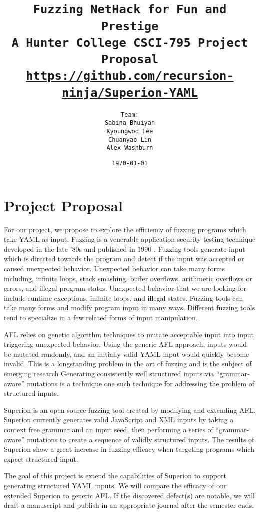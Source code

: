 \documentclass[12pt]{diazessay}
\title{\texttt{\huge{Fuzzing NetHack for Fun and Prestige} \\\vspace{-0.65cm} {\large A Hunter College CSCI-795 Project Proposal}\\\normalsize\url{https://github.com/recursion-ninja/Superion-YAML}}} %
\author{\texttt{{\Huge Team:}\\\vspace*{-0.5em} 
		Sabina Bhuiyan \\\vspace*{-0.5em} 
		Kyoungwoo Lee \\\vspace*{-0.5em}
		Chuanyao Lin \\\vspace*{-0.25em}
		Alex Washburn}} %
\date{\texttt{\today}} %
\begin{document}
\maketitle %

\vspace{-1cm}
\section*{Project Proposal}

For our project, we propose to explore the efficiency of fuzzing programs which take YAML as input.
Fuzzing is a venerable application security testing technique developed in the late '80s \cite{Barton1988} and published in 1990 \cite{Miller1990}.
Fuzzing tools generate input which is directed towards the program and detect if the input was accepted or caused unexpected behavior.
Unexpected behavior can take many forms including, infinite loops, stack smashing, buffer overflows, arithmetic overflows or errors, and illegal program states.
Unexpected behavior that we are looking for include runtime exceptions, infinite loops, and illegal states.
Fuzzing tools can take many forms \cite{ModelBasedFuzzing}\cite{GrammarBasedFuzzing}\cite{ProtocolBasedFuzzing} and modify program input in many ways.
Different fuzzing tools tend to specialize in a few related forms of input\cite{InputDiversity} manipulation.

AFL relies on genetic algorithm techniques\cite{InputMutationAlgorithm} to mutate acceptable input into input triggering unexpected behavior. Using the generic AFL approach, inputs would be mutated randomly, and an initially valid YAML input would quickly become invalid.
This is a longstanding problem in the art of fuzzing and is the subject of emerging research
Generating consistently well structured inputs via ``grammar-aware'' mutations is a technique one such technique for addressing the problem of structured inputs.

Superion \cite{superion} is an open source fuzzing tool created by modifying and extending AFL.
Superion currently generates valid JavaScript and XML inputs by taking a context free grammar and an input seed, then performing a series of ``grammar-aware'' mutations to create a sequence of validly structured inputs.
The results of Superion show a great increase in fuzzing efficacy when targeting programs which expect structured input. 

The goal of this project is extend the capabilities of Superion to support generating structured YAML inputs.
We will compare the efficacy of our extended Superion to generic AFL.
If the discovered defect(s) are notable, we will draft a manuscript and publish in an appropriate journal after the semester ends.
\end{document}
